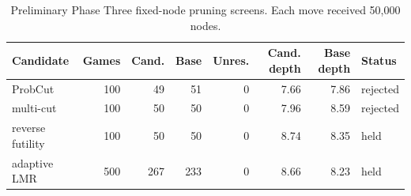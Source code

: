 \begin{table}[t]
\centering
\caption{Preliminary Phase Three fixed-node pruning screens. Each move received 50,000 nodes.}
\label{tab:phase-three-pruning}
\scriptsize
\begin{tabular}{lrrrrrrl}
\toprule
Candidate & Games & Cand. & Base & Unres. & Cand. depth & Base depth & Status \\
\midrule
ProbCut & 100 & 49 & 51 & 0 & 7.66 & 7.86 & rejected \\
multi-cut & 100 & 50 & 50 & 0 & 7.96 & 8.59 & rejected \\
reverse futility & 100 & 50 & 50 & 0 & 8.74 & 8.35 & held \\
adaptive LMR & 500 & 267 & 233 & 0 & 8.66 & 8.23 & held \\
\bottomrule
\end{tabular}
\end{table}
